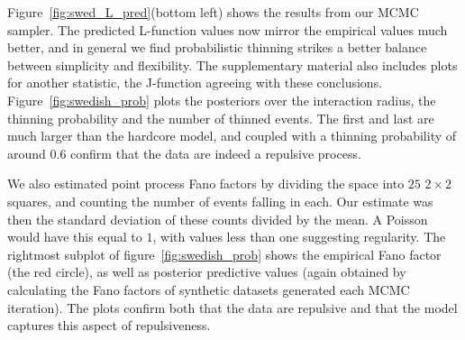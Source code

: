 \documentclass{statsoc}
\begin{document}

Figure~\ref{fig:swed_L_pred}(bottom left) shows the results from our MCMC sampler. 
The predicted  L-function values now mirror the empirical values much better, and in general we find probabilistic thinning strikes a 
better balance between simplicity and flexibility. The supplementary material also includes plots for another statistic,
the J-function \citep{vanLies96} agreeing with these conclusions.
Figure~\ref{fig:swedish_prob} plots the posteriors over the interaction radius, the thinning probability and the number of thinned events.
The first and last are much larger than the hardcore model, and coupled with a thinning probability of around $0.6$ confirm that the data are
indeed a repulsive process. 

We also estimated point process Fano factors by
dividing the space into $25$ $2 \times 2$ squares, and counting the number of events falling in each. Our estimate was then the standard 
deviation of these counts divided by the mean. A Poisson would have this equal to $1$, with values less than one suggesting regularity. The
rightmost subplot of figure~\ref{fig:swedish_prob} shows the empirical Fano factor (the red circle), as well as posterior predictive values 
(again obtained by calculating the Fano factors of synthetic datasets generated each MCMC iteration).
The plots confirm both that the data are repulsive and that the model captures this aspect of repulsiveness.
\end{document}
